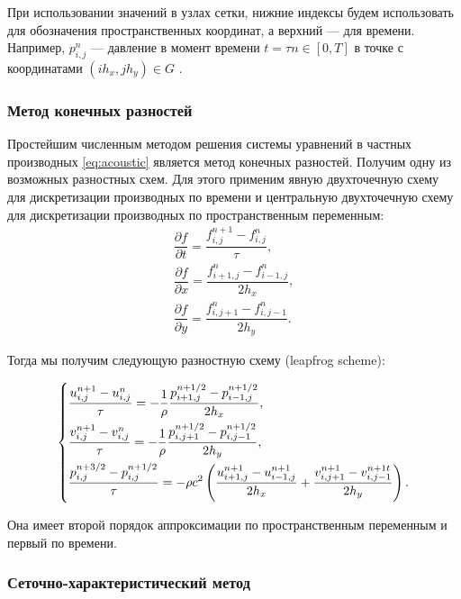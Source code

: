 При использовании значений в узлах сетки, нижние индексы будем использовать для обозначения пространственных координат, а верхний --- для времени. Например, $p_{i,j}^n$ --- давление в момент времени $t=\tau n \in [0,T]$ в точке с координатами $\left(i h_x, j h_y\right) \in G$ .

\subsubsection{Метод конечных разностей}

Простейшим численным методом решения системы уравнений в частных производных \eqref{eq:acoustic} является метод конечных разностей. Получим одну из возможных разностных схем. Для этого применим явную двухточечную схему для дискретизации производных по времени и центральную двухточечную схему для дискретизации производных по пространственным переменным:
\begin{gather*}
    \dfrac{\partial f}{\partial t} = \dfrac{f^{n+1}_{i,j} - f^{n}_{i,j}}{\tau} , \\
    \dfrac{\partial f}{\partial x} = \dfrac{f^{n}_{i+1,j} - f^{n}_{i-1,j}}{2 h_x} , \\
    \dfrac{\partial f}{\partial y} = \dfrac{f^{n}_{i,j+1} - f^{n}_{i,j-1}}{2 h_y} .
\end{gather*}

\noindent Тогда мы получим следующую разностную схему (leapfrog scheme):

\begin{equation}
\begin{dcases}
	\frac{u^{n+1}_{i,j} - u^{n}_{i,j}}{\tau} = -\frac{1}{\rho}\frac{p^{n+1/2}_{i+1,j} - p^{n+1/2}_{i-1,j}}{2 h_x} , \\
	\frac{v^{n+1}_{i,j} - v^{n}_{i,j}}{\tau} = -\frac{1}{\rho}\frac{p^{n+1/2}_{i,j+1} - p^{n+1/2}_{i,j-1}}{2 h_y} , \\
    \dfrac{p^{n+3/2}_{i,j} - p^{n+1/2}_{i,j}}{\tau}= -\rho c^2 \left(\frac{u^{n+1}_{i+1,j} - u^{n+1}_{i-1,j}}{2 h_x} + \dfrac{v^{n+1}_{i,j+1} - v^{n+1t}_{i,j-1}}{2 h_y}\right)  . \\
\end{dcases}
\label{eq:diff}
\end{equation}

\noindent Она имеет второй порядок аппроксимации по пространственным переменным и первый по времени.

\subsubsection{Сеточно-характеристический метод}

